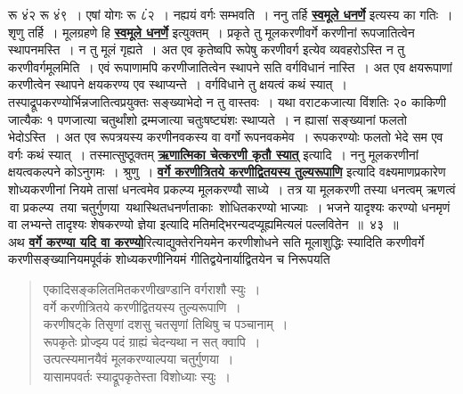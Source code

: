 \documentclass[11pt, openany]{book}
\begin{document}
{{रू ४ं२ रू ४ं९~। एषां योगः रू ८ं२~। नह्ययं वर्गः सम्भवति~। ननु तर्हि 
\hyperref[13]{\textbf{स्वमूले धनर्णे}} इत्यस्य का गतिः~। शृणु तर्हि~। मूलग्रहणे हि \hyperref[13]{\textbf{स्वमूले धनर्णे}} इत्युक्तम्~। प्रकृते तु मूलकरणीवर्गे करणीनां रूपजातित्वेन स्थापनमस्ति~। न तु 
मूलं गृह्यते~। अत एव कृतेष्वपि रूपेषु करणीवर्ग इत्येव
व्यवहरोऽस्ति न तु  करणीवर्गमूलमिति~। एवं रूपाणामपि करणीजातित्वेन स्थापने सति वर्गविधानं नास्ति~। अत एव क्षयरूपाणां करणीत्वेन स्थापने क्षयकरण्य एव स्थाप्यन्ते~। वर्गविधाने तु क्षयत्वं कथं स्यात्~। तस्पाद्रूपकरण्योर्भिन्नजातित्वप्रयुक्तः
सङ्ख्याभेदो न तु वास्तवः~। यथा वराटकजात्या विंशतिः २० काकिणी जात्यैकः १
पणजात्या चतुर्थांशो द्रम्मजात्या चतुःषष्ट्यंशः स्थाप्यते~। न ह्यासां
\newpage
\noindent सङ्ख्यानां फलतो भेदोऽस्ति~। अत एव रूपत्रयस्य करणीनवकस्य वा वर्गो
रूपनवकमेव~। रूपकरण्योः फलतो भेदे सम एव वर्गः कथं स्यात्~।
तस्मात्सुष्ठूक्तम् \hyperref[42]{\textbf{ऋणात्मिका चेत्करणी कृतौ स्यात्}} इत्यादि~। ननु मूलकरणीनां क्षयत्वकल्पने कोऽनुगमः~। 
श्रुणु~। \hyperref[44]{\textbf{वर्गे करणीत्रितये करणीद्वितयस्य तुल्यरूपाणि}} इत्यादि
वक्ष्यमाणप्रकारेण 
शोध्यकरणीनां नियमे तासां धनत्वमेव प्रकल्प्य मूलकरण्यौ साध्ये~। तत्र या
मूलकरणी तस्या धनत्वम् ऋणत्वं \,वा प्रकल्प्य \,तया चतुर्गुणया \,यथास्थितधनर्णताकाः \,शोधितकरण्यो भाज्याः~। भजने यादृश्यः करण्यो धनमृणं वा लभ्यन्ते तादृश्यः 
शेषकरण्यो ज्ञेया इत्यादि मतिमद्भिरन्यदप्यूह्यमित्यलं पल्लवितेन~॥~४३~॥\\

\vspace{-4mm}
 अथ \hyperref[41]{\textbf{वर्गे करण्या यदि वा करण्यो}}रित्याद्युक्तेरनियमेन करणीशोधने सति
मूलाशुद्धिः स्यादिति करणीवर्गे करणीसङ्ख्यानियमपूर्वकं शोध्यकरणीनियमं
गीतिद्वयेनार्याद्वितयेन च निरूपयति\textendash \,

 \label{44}
\begin{quote}
    \ab
    एकादिसङ्कलितमितकरणीखण्डानि वर्गराशौ स्युः~। \\
 वर्गे करणीत्रितये करणीद्वितयस्य तुल्यरूपाणि~। \\

\vspace{-5mm}
 करणीषट्के तिसृणां दशसु चतसृणां तिथिषु च पञ्चानाम्~। \\
 रूपकृतेः प्रोज्झ्य पदं ग्राह्यं चेदन्यथा न सत् क्वापि~। \\

\vspace{-5mm}
 उत्पत्स्यमानयैवं मूलकरण्याल्पया चतुर्गुणया~। \\
 यासामपवर्तः स्याद्रूपकृतेस्ता विशोध्याः स्युः~। \\


\end{quote}}}
\end{document}
